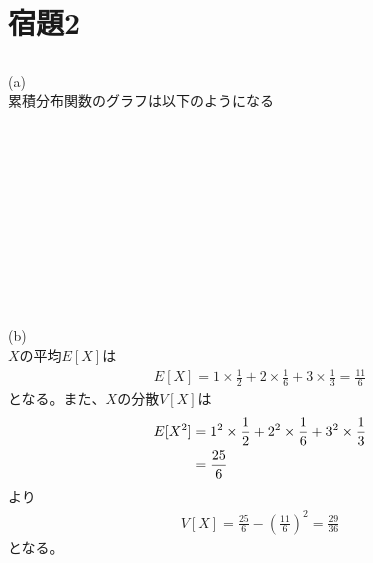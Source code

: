 \documentclass{jsarticle}
\begin{document}
  \section{宿題2}
    \subsection{}
    (a)\\
    累積分布関数のグラフは以下のようになる\\
    \\
    \\
    \\
    \\
    \\
    \\
    \\
    \\
    \\
    \\
    \\
    (b)\\
    $X$の平均$E[X]$は
    \begin{align}
      E[X] = 1\times \frac{1}{2} + 2\times \frac{1}{6} + 3\times \frac{1}{3} = \frac{11}{6}
    \end{align}
    となる。また、$X$の分散$V[X]$は
    \begin{align}
      E[X^2] &= 1^2\times\frac{1}{2} + 2^2\times \frac{1}{6} + 3^2\times\frac{1}{3} \notag \\
      &= \frac{25}{6}
    \end{align}
    より
    \begin{align}
      V[X] = \frac{25}{6} - \left(\frac{11}{6}\right)^2 = \frac{29}{36}
    \end{align}
    となる。
\end{document}
